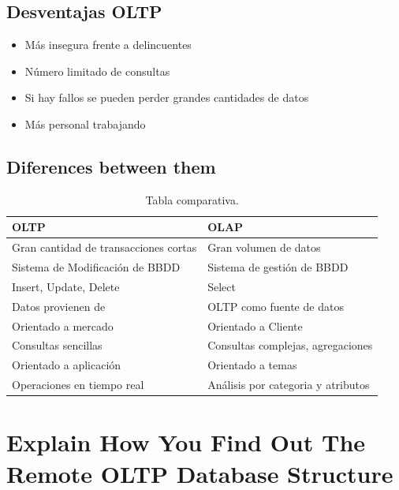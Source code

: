 \documentclass[a4paper 
,twoside
]{article}
\begin{document}
  \subsection{Desventajas OLTP}
  \begin{itemize}
    \item Más insegura frente a delincuentes
    \item Número limitado de consultas
    \item Si hay fallos se pueden perder grandes cantidades de datos
    \item Más personal trabajando
  \end{itemize}

  \subsection{Diferences between them}

  \begin{table}[htbp]
    \begin{center}
    \begin{tabular}{|l|l|}
    \hline
    OLTP & OLAP \\
    \hline \hline
    Gran cantidad de transacciones cortas & Gran volumen de datos \\ \hline
    Sistema de Modificación de BBDD & Sistema de gestión de BBDD \\ \hline
    Insert, Update, Delete & Select \\ \hline
   Datos provienen de  & OLTP como fuente de datos \\ \hline
    Orientado a mercado & Orientado a Cliente \\ \hline
    Consultas sencillas & Consultas complejas, agregaciones \\ \hline
    Orientado a aplicación & Orientado a temas \\ \hline
    Operaciones en tiempo real & Análisis por categoria y atributos \\ \hline
    \end{tabular}
    \caption{Tabla comparativa.}
    \label{tabla:sencilla}
    \end{center}
    \end{table}

\pagebreak
\section{Explain How You Find Out The Remote OLTP Database Structure}
\end{document}

